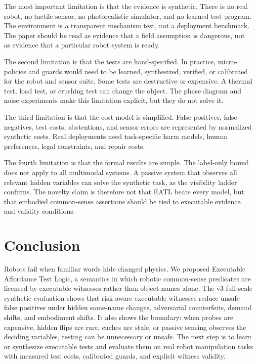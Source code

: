 \documentclass{article}
\begin{document}
The most important limitation is that the evidence is synthetic.  There is no
real robot, no tactile sensor, no photorealistic simulator, and no learned test
program.  The environment is a transparent mechanism test, not a deployment
benchmark.  The paper should be read as evidence that a field assumption is
dangerous, not as evidence that a particular robot system is ready.

The second limitation is that the tests are hand-specified.  In practice,
micro-policies and guards would need to be learned, synthesized, verified, or
calibrated for the robot and sensor suite.  Some tests are destructive or
expensive.  A thermal test, load test, or crushing test can change the object.
The phase diagram and noise experiments make this limitation explicit, but they
do not solve it.

The third limitation is that the cost model is simplified.  False positives,
false negatives, test costs, abstentions, and sensor errors are represented by
normalized synthetic costs.  Real deployments need task-specific harm models,
human preferences, legal constraints, and repair costs.

The fourth limitation is that the formal results are simple.  The label-only
bound does not apply to all multimodal systems.  A passive system that observes
all relevant hidden variables can solve the synthetic task, as the visibility
ladder confirms.  The novelty claim is therefore not that EATL beats every
model, but that embodied common-sense assertions should be tied to executable
evidence and validity conditions.

\section{Conclusion}

Robots fail when familiar words hide changed physics.  We proposed Executable
Affordance Test Logic, a semantics in which robotic common-sense predicates are
licensed by executable witnesses rather than object names alone.  The v3
full-scale synthetic evaluation shows that risk-aware executable witnesses
reduce unsafe false positives under hidden same-name changes, adversarial
counterfeits, demand shifts, and embodiment shifts.  It also shows the
boundary: when probes are expensive, hidden flips are rare, caches are stale, or
passive sensing observes the deciding variables, testing can be unnecessary or
unsafe.  The next step is to learn or synthesize executable tests and evaluate
them on real robot manipulation tasks with measured test costs, calibrated
guards, and explicit witness validity.
\end{document}

